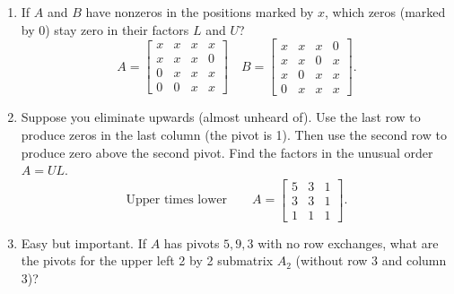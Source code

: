 \documentclass[14pt, a4paper]{article}
\begin{document}
\begin{enumerate}[resume]
    \item If $A$ and $B$ have nonzeros in the positions marked by $x$, which zeros (marked by $0$) stay zero in their factors $L$ and $U$?
          \[
              A = \begin{bmatrix}
                  x & x & x & x \\
                  x & x & x & 0 \\
                  0 & x & x & x \\
                  0 & 0 & x & x
              \end{bmatrix}
              \quad
              B = \begin{bmatrix}
                  x & x & x & 0 \\
                  x & x & 0 & x \\
                  x & 0 & x & x \\
                  0 & x & x & x
              \end{bmatrix}.
          \]

    \item Suppose you eliminate upwards (almost unheard of). Use the last row to produce zeros in the last column (the pivot is 1). Then use the second row to produce zero above the second pivot. Find the factors in the unusual order $A = UL$.
          \[
              \text{Upper times lower}\qquad
              A = \begin{bmatrix}
                  5 & 3 & 1 \\
                  3 & 3 & 1 \\
                  1 & 1 & 1
              \end{bmatrix}.
          \]

    \item Easy but important. If $A$ has pivots $5,9,3$ with no row exchanges, what are the pivots for the upper left 2 by 2 submatrix $A_2$ (without row 3 and column 3)?
\end{enumerate}
\end{document}
